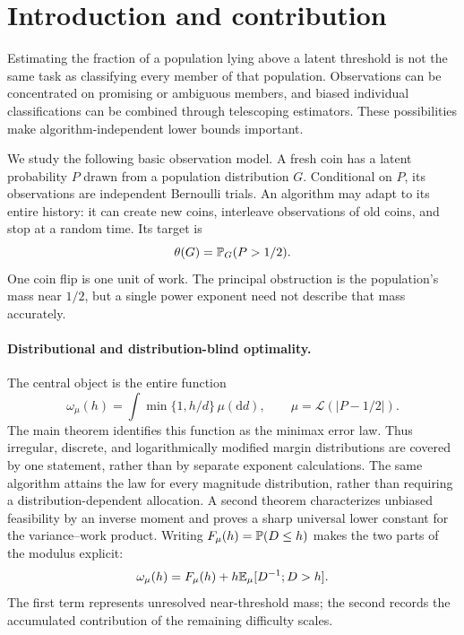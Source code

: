 \section{Introduction and contribution}
Estimating the fraction of a population lying above a latent threshold is
not the same task as classifying every member of that population. Observations
can be concentrated on promising or ambiguous members, and biased individual
classifications can be combined through telescoping estimators. These
possibilities make algorithm-independent lower bounds important.

We study the following basic observation model. A fresh coin has a latent
probability $P$ drawn from a population distribution $G$. Conditional on $P$,
its observations are independent Bernoulli trials. An algorithm may adapt to
its entire history: it can create new coins, interleave observations of old
coins, and stop at a random time. Its target is
\begin{equation}\label{eq:target}
 \theta(G)=\mathbb P_G(P>1/2).
\end{equation}
One coin flip is one unit of work. The principal obstruction is the
population's mass near $1/2$, but a single power exponent need not describe
that mass accurately.

\paragraph{Distributional and distribution-blind optimality.}
The central object is the entire function
\begin{equation}\label{eq:modulus-intro}
 \omega_\mu(h)=\int\min\{1,h/d\}\,\mu(\mathrm d d),
 \qquad \mu=\mathcal L(|P-1/2|).
\end{equation}
The main theorem identifies this function as the minimax error law. Thus
irregular, discrete, and logarithmically modified margin distributions are
covered by one statement, rather than by separate exponent calculations.
The same algorithm attains the law for every magnitude distribution, rather
than requiring a distribution-dependent allocation. A second theorem
characterizes unbiased feasibility by an inverse moment and proves a sharp
universal lower constant for the variance--work product.
Writing $F_\mu(h)=\mathbb P(D\le h)$ makes the two parts of the modulus explicit:
\[
 \omega_\mu(h)=F_\mu(h)+h\mathbb E_\mu[D^{-1};D>h].
\]
The first term represents unresolved near-threshold mass; the second records
the accumulated contribution of the remaining difficulty scales.

